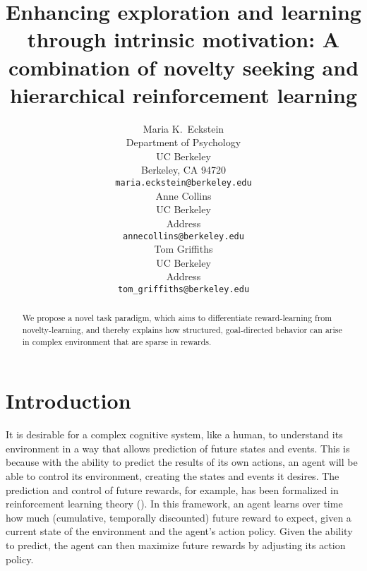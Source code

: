 \documentclass{article}
\title{Enhancing exploration and learning through intrinsic motivation: A combination of novelty seeking and hierarchical reinforcement learning}
\author{
  Maria K.~Eckstein \\
  Department of Psychology \\
  UC Berkeley \\
  Berkeley, CA 94720 \\
  \texttt{maria.eckstein@berkeley.edu} \\  
  \And
  Anne Collins \\
  UC Berkeley \\
  Address \\
  \texttt{annecollins@berkeley.edu} \\
  \And
  Tom Griffiths \\
  UC Berkeley \\
  Address \\
  \texttt{tom_griffiths@berkeley.edu} \\
}
\begin{document}
\maketitle

\begin{abstract}
  We propose a novel task paradigm, which aims to differentiate reward-learning from novelty-learning, and thereby explains how structured, goal-directed behavior can arise in complex environment that are sparse in rewards. 
\end{abstract}


\section{Introduction}

It is desirable for a complex cognitive system, like a human, to understand its environment in a way that allows prediction of future states and events. This is because with the ability to predict the results of its own actions, an agent will be able to control its environment, creating the states and events it desires. The prediction and control of future rewards, for example, has been formalized in reinforcement learning theory (\cite{sutton_reinforcement_2017}). In this framework, an agent learns over time how much (cumulative, temporally discounted) future reward to expect, given a current state of the environment and the agent's action policy. Given the ability to predict, the agent can then maximize future rewards by adjusting its action policy.
\end{document}
